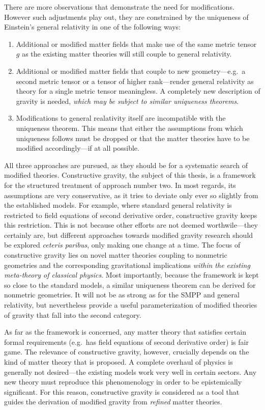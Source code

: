There are more observations \cite{} that demonstrate the need for modifications. However such adjustments play out, they are constrained by the uniqueness of Einstein's general relativity in one of the following ways:
\begin{enumerate}
  \item Additional or modified matter fields that make use of the same metric tensor $g$ as the existing matter theories will still couple to general relativity.
  \item Additional or modified matter fields that couple to new geometry---e.g.\ a second metric tensor or a tensor of higher rank---render general relativity as theory for a single metric tensor meaningless. A completely new description of gravity is needed, \emph{which may be subject to similar uniqueness theorems}.
  \item Modifications to general realativity itself are incompatible with the uniqueness theorem. This means that either the assumptions from which uniqueness follows must be dropped or that the matter theories have to be modified accordingly---if at all possible.
\end{enumerate}
All three approaches are pursued, as they should be for a systematic search of modified theories. Constructive gravity, the subject of this thesis, is a framework for the structured treatment of approach number two. In most regards, its assumptions are very conservative, as it tries to deviate only ever so slightly from the established models. For example, where standard general relativity is restricted to field equations of second derivative order, constructive gravity keeps this restriction. This is not because other efforts are not deemed worthwile---they certainly are, but different approaches towards modified gravity research should be explored \emph{ceteris paribus}, only making one change at a time. The focus of constructive gravity lies on novel matter theories coupling to nonmetric geometries and the corresponding gravitational implications \emph{within the existing meta-theory of classical physics}. Most importantly, because the framework is kept so close to the standard models, a similar uniqueness theorem can be derived for nonmetric geometries. It will not be as strong as for the SMPP and general relativity, but nevertheless provide a useful parameterization of modified theories of gravity that fall into the second category.

As far as the framework is concerned, any matter theory that satisfies certain formal requirements (e.g.\ has field equations of second derivative order) is fair game. The relevance of constructive gravity, however, crucially depends on the kind of matter theory that is proposed. A complete overhaul of physics is generally not desired---the existing models work very well in certain sectors. Any new theory must reproduce this phenomenology in order to be epistemically significant. For this reason, constructive gravity is considered as a tool that guides the derivation of modified gravity from \emph{refined} matter theories.

